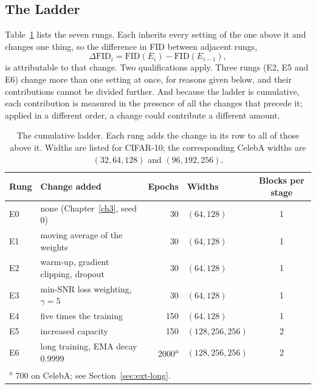 \subsection{The Ladder}

Table~\ref{tab:ladder} lists the seven rungs. Each inherits every setting of the one above it and
changes one thing, so the difference in FID between adjacent rungs,
\begin{equation}
    \Delta\mathrm{FID}_i = \mathrm{FID}(E_i) - \mathrm{FID}(E_{i-1}),
    \label{eq:ext-delta}
\end{equation}
is attributable to that change. Two qualifications apply. Three rungs (E2, E5 and E6) change more
than one setting at once, for reasons given below, and their contributions cannot be divided further.
And because the ladder is cumulative, each contribution is measured in the presence of all the
changes that precede it; applied in a different order, a change could contribute a different amount.

\begin{table}[htbp]
    \centering
    \caption{The cumulative ladder. Each rung adds the change in its row to all of those above it.
    Widths are listed for CIFAR-10; the corresponding CelebA widths are $(32, 64, 128)$ and
    $(96, 192, 256)$.}
    \label{tab:ladder}
    \small
    \begin{tabular}{llrlc}
        \toprule
        Rung & Change added & Epochs & Widths & Blocks per stage \\
        \midrule
        E0 & none (Chapter~\ref{ch3}, seed 0)            & 30  & $(64, 128)$ & 1 \\
        E1 & moving average of the weights              & 30  & $(64, 128)$ & 1 \\
        E2 & warm-up, gradient clipping, dropout        & 30  & $(64, 128)$ & 1 \\
        E3 & min-SNR loss weighting, $\gamma = 5$         & 30  & $(64, 128)$ & 1 \\
        E4 & five times the training                      & 150 & $(64, 128)$ & 1 \\
        E5 & increased capacity                           & 150 & $(128, 256, 256)$ & 2 \\
        E6 & long training, EMA decay 0.9999              & 2000\textsuperscript{a} &
        $(128, 256, 256)$ & 2 \\
        \bottomrule
        \multicolumn{5}{l}{\footnotesize \textsuperscript{a} 700 on CelebA; see
        Section~\ref{sec:ext-long}.}
    \end{tabular}
\end{table}

